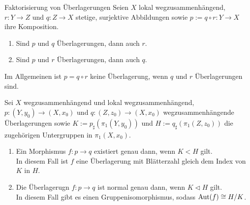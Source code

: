 \begin{Satz}{Faktorisierung von Überlagerungen}
    Seien $X$ lokal wegzusammenhängend, $r\colon Y \rightarrow Z$ und
    $q\colon Z \rightarrow X$ stetige, surjektive Abbildungen sowie
    $p := q \circ r\colon Y \rightarrow X$ ihre Komposition.
    \begin{enumerate}
        \item
        Sind $p$ und $q$ Überlagerungen, dann auch $r$.

        \item
        Sind $p$ und $r$ Überlagerungen, dann auch $q$.
    \end{enumerate}
\end{Satz}

\begin{Bem}
    Im Allgemeinen ist $p = q \circ r$ keine Überlagerung, wenn
    $q$ und $r$ Überlagerungen sind.
\end{Bem}

\begin{Kor}
    Sei $X$ wegzusammenhängend und lokal wegzusammenhängend,\\
    $p\colon (Y, y_0) \rightarrow (X, x_0)$ und
    $q\colon (Z, z_0) \rightarrow (X, x_0)$ wegzusammenhängende Überlagerungen
    sowie $K := p_\sharp(\pi_1(Y, y_0))$ und $H := q_\sharp(\pi_1(Z, z_0))$
    die zugehörigen Untergruppen in $\pi_1(X, x_0)$.
    \begin{enumerate}
        \item
        Ein Morphismus $f\colon p \rightarrow q$ existiert genau dann, wenn
        $K < H$ gilt. \\
        In diesem Fall ist $f$ eine Überlagerung mit Blätterzahl gleich dem
        Index von $K$ in $H$.

        \item
        Die Überlagerugn $f\colon p \rightarrow q$ ist normal genau dann, wenn
        $K \vartriangleleft H$ gilt. \\
        In diesem Fall gibt es einen Gruppenisomorphismus, sodass
        $\text{Aut}(f) \cong H/K$.
    \end{enumerate}
\end{Kor}

\linie

